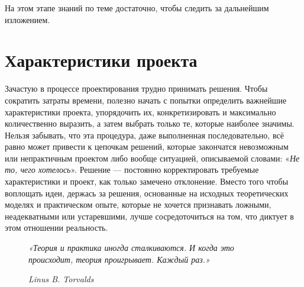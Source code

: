 \documentclass[a4paper, 10pt, final]{article} %
\begin{document}
    На этом этапе знаний по теме достаточно, чтобы следить за дальнейшим изложением.

    \section{Характеристики проекта}\label{sec:ProjectCharacteristics}
    Зачастую в процессе проектирования трудно принимать решения.
    Чтобы сократить затраты времени, полезно начать с попытки определить важнейшие характеристики проекта, упорядочить их, конкретизировать и максимально количественно выразить, а затем выбрать только те, которые наиболее значимы.
    Нельзя забывать, что эта процедура, даже выполненная последовательно, всё равно может привести к цепочкам решений, которые закончатся невозможным или непрактичным проектом либо вообще ситуацией, описываемой словами: «\emph{Не то, чего хотелось}».
    Решение --- постоянно корректировать требуемые характеристики и проект, как только замечено отклонение.
    Вместо того чтобы воплощать идеи, держась за решения, основанные на исходных теоретических моделях и практическом опыте, которые не хочется признавать ложными, неадекватными или устаревшими, лучше сосредоточиться на том, что диктует в этом отношении реальность.

    \begin{figure}[H]
        \Centering
        \vspace{1ex}
        \textit{«Теория и практика иногда сталкиваются. И когда это происходит, теория проигрывает. Каждый раз.»}

        \RaggedLeft
        \vspace{1ex}

        \textit{\scriptsize{Linus B. Torvalds}}
        \vspace{1ex}
    \end{figure}
\end{document}
